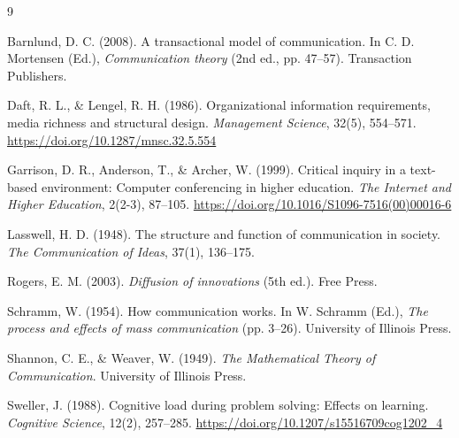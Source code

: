 \renewcommand{\refname}{10. Tài liệu tham khảo}

\begin{thebibliography}{9}

Barnlund, D. C. (2008). A transactional model of communication. In C. D. Mortensen (Ed.), \textit{Communication theory} (2nd ed., pp. 47--57). Transaction Publishers.

Daft, R. L., \& Lengel, R. H. (1986). Organizational information requirements, media richness and structural design. \textit{Management Science}, 32(5), 554--571. \url{https://doi.org/10.1287/mnsc.32.5.554}

Garrison, D. R., Anderson, T., \& Archer, W. (1999). Critical inquiry in a text-based environment: Computer conferencing in higher education. \textit{The Internet and Higher Education}, 2(2-3), 87--105. \url{https://doi.org/10.1016/S1096-7516(00)00016-6}

Lasswell, H. D. (1948). The structure and function of communication in society. \textit{The Communication of Ideas}, 37(1), 136--175.

Rogers, E. M. (2003). \textit{Diffusion of innovations} (5th ed.). Free Press.

Schramm, W. (1954). How communication works. In W. Schramm (Ed.), \textit{The process and effects of mass communication} (pp. 3--26). University of Illinois Press.

Shannon, C. E., \& Weaver, W. (1949). \textit{The Mathematical Theory of Communication}. University of Illinois Press.

Sweller, J. (1988). Cognitive load during problem solving: Effects on learning. \textit{Cognitive Science}, 12(2), 257--285. \url{https://doi.org/10.1207/s15516709cog1202_4}

\end{thebibliography}
